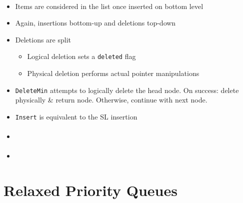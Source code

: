 \documentclass[usenames,dvipsnames]{beamer}
\begin{document}
\begin{frame}{}
\framesubtitle{\citeauthor{shavit2000skiplist}}

\begin{itemize}
\item Items are considered in the list once inserted on bottom level
\item Again, insertions bottom-up and deletions top-down
\item Deletions are split
    \begin{itemize}
    \item Logical deletion sets a \lstinline|deleted| flag
    \item Physical deletion performs actual pointer manipulations
    \end{itemize}
\item \lstinline|DeleteMin| attempts to logically delete the head node.
     On success: delete physically \& return node. Otherwise, continue with
     next node.
\item \lstinline|Insert| is equivalent to the \ac{SL} insertion
\end{itemize}
\end{frame}

\begin{frame}{}
\framesubtitle{\citeauthor{shavit2000skiplist}}

\begin{itemize}
\item
\end{itemize}
\end{frame}

\begin{frame}{}
\framesubtitle{\citeauthor{shavit2000skiplist}}

\begin{itemize}
\item
\end{itemize}
\end{frame}

\section{Relaxed Priority Queues} \label{sec:relaxed}

\begin{frame}{}

\end{frame}
\end{document}
